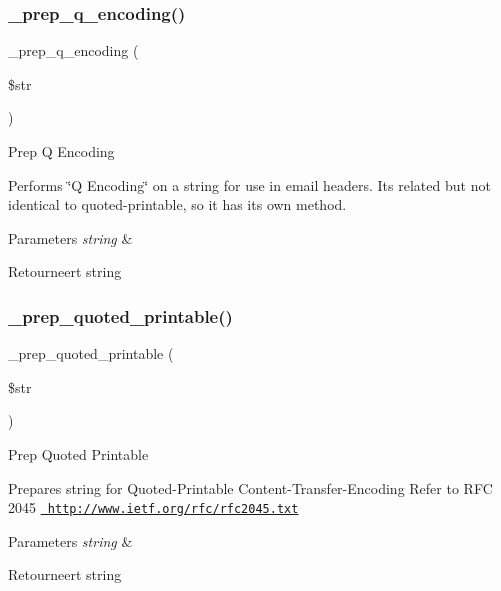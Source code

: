 \subsubsection{\texorpdfstring{\_prep\_q\_encoding()}{\_prep\_q\_encoding()}}
{\footnotesize\ttfamily \+\_\+prep\+\_\+q\+\_\+encoding (\begin{DoxyParamCaption}\item[{}]{\$str }\end{DoxyParamCaption})\hspace{0.3cm}{\ttfamily [protected]}}

Prep Q Encoding

Performs \char`\"{}\+Q Encoding\char`\"{} on a string for use in email headers. It\textquotesingle{}s related but not identical to quoted-\/printable, so it has its own method.


\begin{DoxyParams}{Parameters}
{\em string} & \\
\hline
\end{DoxyParams}
\begin{DoxyReturn}{Retourneert}
string 
\end{DoxyReturn}
\mbox{\label{class_c_i___email_af2beda05a0ab5d0ec65b03da633b1d33}} 
\subsubsection{\texorpdfstring{\_prep\_quoted\_printable()}{\_prep\_quoted\_printable()}}
{\footnotesize\ttfamily \+\_\+prep\+\_\+quoted\+\_\+printable (\begin{DoxyParamCaption}\item[{}]{\$str }\end{DoxyParamCaption})\hspace{0.3cm}{\ttfamily [protected]}}

Prep Quoted Printable

Prepares string for Quoted-\/\+Printable Content-\/\+Transfer-\/\+Encoding Refer to R\+FC 2045 \href{http://www.ietf.org/rfc/rfc2045.txt}{\texttt{ http\+://www.\+ietf.\+org/rfc/rfc2045.\+txt}}


\begin{DoxyParams}{Parameters}
{\em string} & \\
\hline
\end{DoxyParams}
\begin{DoxyReturn}{Retourneert}
string 
\end{DoxyReturn}
\mbox{\label{class_c_i___email_a3a624f07cca99fe6ab1b61dbec56eef8}} 

